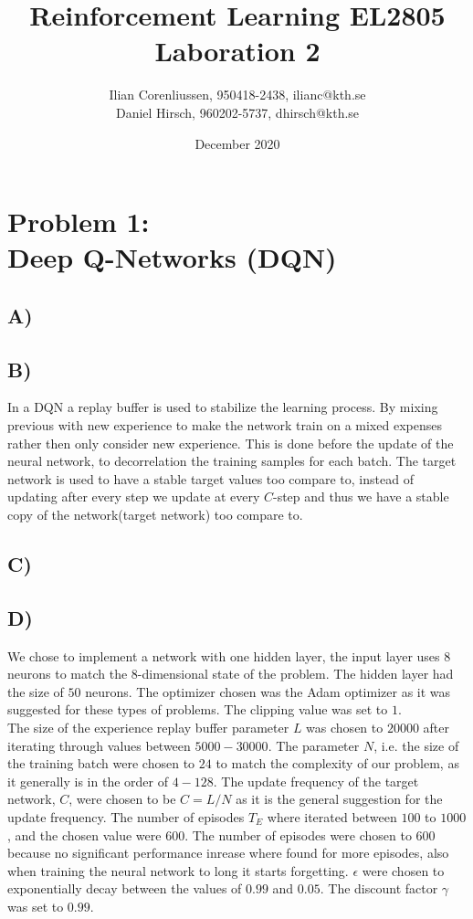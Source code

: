 \documentclass{article}
\title{Reinforcement Learning EL2805\\
       Laboration 2}
\author{Ilian Corenliussen, 950418-2438, ilianc@kth.se\\ 
        Daniel Hirsch, 960202-5737, dhirsch@kth.se}
\date{December 2020}
\begin{document}
\maketitle

\section*{Problem 1: \\
        Deep Q-Networks (DQN)}
\subsection*{A)}

\subsection*{B)} In a DQN a replay buffer is used to stabilize the learning process. By mixing previous with new experience to make the network train on a mixed expenses rather then only consider new experience. This is done before the update of the neural network, to decorrelation the training samples for each batch. The target network is used to have a stable target values too compare to, instead of updating after every step we update at every $C$-step and thus we have a stable copy of the network(target network) too compare to.
\subsection*{C)}

\subsection*{D)}
We chose to implement a network with one hidden layer, the input layer uses $8$ neurons to match the 8-dimensional state of the problem. The hidden layer had the size of $50$ neurons. The optimizer chosen was the Adam optimizer as it was suggested for these types of problems. The clipping value was set to $1$.\\
\noindent The size of the experience replay buffer parameter $L$ was chosen to $20000$ after iterating through values between $5000 - 30000$. The parameter $N$, i.e. the size of the training batch were chosen to $24$ to match the complexity of our problem, as it generally is in the order of $4 - 128$.
The update frequency of the target network, $C$, were chosen to be $C = L/N$ as it is the general suggestion for the update frequency. The number of episodes $T_E$ where iterated between $100$ to $1000$, and the chosen value were $600$. The number of episodes were chosen to $600$ because no significant performance inrease where found for more episodes, also when training the neural network to long it starts forgetting. $\epsilon$ were chosen to exponentially decay between the values of $0.99$ and $0.05$. The discount factor $\gamma$ was set to $0.99$. 
\end{document}
